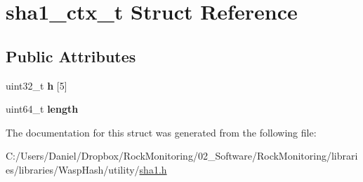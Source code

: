 \hypertarget{structsha1__ctx__t}{}\section{sha1\+\_\+ctx\+\_\+t Struct Reference}
\label{structsha1__ctx__t}
\subsection*{Public Attributes}
\begin{DoxyCompactItemize}
\item 
uint32\+\_\+t {\bfseries h} \mbox{[}5\mbox{]}\hypertarget{structsha1__ctx__t_a978bebed6a790358ee76251214d3702d}{}\label{structsha1__ctx__t_a978bebed6a790358ee76251214d3702d}

\item 
uint64\+\_\+t {\bfseries length}\hypertarget{structsha1__ctx__t_a63bf6cdcda91a42172781cece59b64de}{}\label{structsha1__ctx__t_a63bf6cdcda91a42172781cece59b64de}

\end{DoxyCompactItemize}


The documentation for this struct was generated from the following file\+:\begin{DoxyCompactItemize}
\item 
C\+:/\+Users/\+Daniel/\+Dropbox/\+Rock\+Monitoring/02\+\_\+\+Software/\+Rock\+Monitoring/libraries/libraries/\+Wasp\+Hash/utility/\hyperlink{sha1_8h}{sha1.\+h}\end{DoxyCompactItemize}
